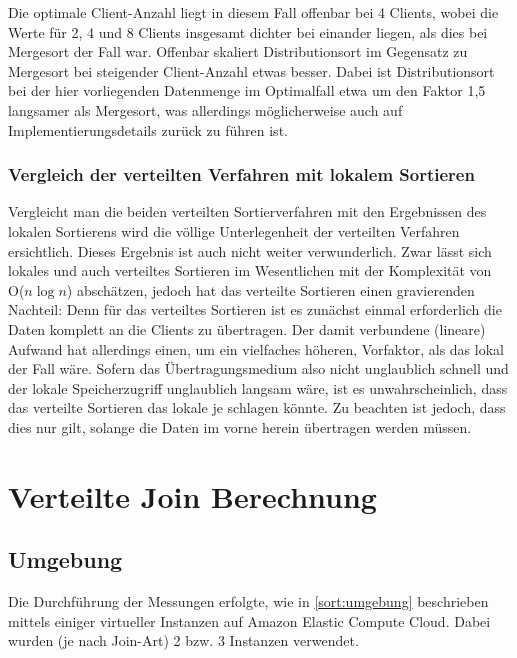 \documentclass[fontsize=12pt,a4paper,headinclude=no,headings=small]{scrartcl}
\begin{document}
Die optimale Client-Anzahl liegt in diesem Fall offenbar bei 4 Clients, wobei die Werte für 2, 4 und 8 Clients insgesamt dichter bei einander liegen, als dies bei Mergesort der Fall war. Offenbar skaliert Distributionsort im Gegensatz zu Mergesort bei steigender Client-Anzahl etwas besser. Dabei ist Distributionsort bei der hier vorliegenden Datenmenge im Optimalfall etwa um den Faktor 1,5 langsamer als Mergesort, was allerdings möglicherweise auch auf Implementierungsdetails zurück zu führen ist.

\subsubsection{Vergleich der verteilten Verfahren mit lokalem Sortieren}
Vergleicht man die beiden verteilten Sortierverfahren mit den Ergebnissen des lokalen Sortierens wird die völlige Unterlegenheit der verteilten Verfahren ersichtlich. Dieses Ergebnis ist auch nicht weiter verwunderlich. Zwar lässt sich lokales und auch verteiltes Sortieren im Wesentlichen mit der Komplexität von O($n \log n$) abschätzen, jedoch hat das verteilte Sortieren einen gravierenden Nachteil: Denn für das verteiltes Sortieren ist es zunächst einmal erforderlich die Daten komplett an die Clients zu übertragen. Der damit verbundene (lineare) Aufwand hat allerdings einen, um ein vielfaches höheren, Vorfaktor, als das lokal der Fall wäre. Sofern das Übertragungsmedium also nicht unglaublich schnell und der lokale Speicherzugriff unglaublich langsam wäre, ist es unwahrscheinlich, dass das verteilte Sortieren das lokale je schlagen könnte. Zu beachten ist jedoch, dass dies nur gilt, solange die Daten im vorne herein übertragen werden müssen.

\section{Verteilte Join Berechnung}
\subsection{Umgebung}
Die Durchführung der Messungen erfolgte, wie in \ref{sort:umgebung} beschrieben mittels einiger virtueller Instanzen auf Amazon Elastic Compute Cloud. Dabei wurden (je nach Join-Art) 2 bzw. 3 Instanzen verwendet.
\end{document}
